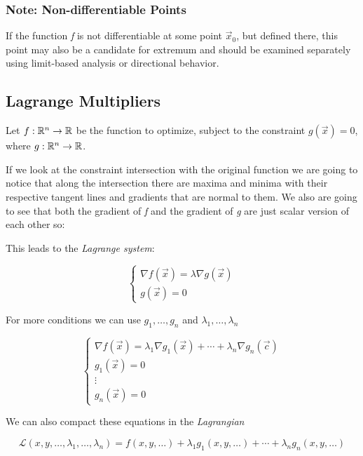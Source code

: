 \subsubsection{Note: Non-differentiable Points}

If the function \emph{f} is not differentiable at some point \( \vec{x}_0 \), but defined there, this 
point may also be a candidate for extremum and should be examined separately using limit-based analysis 
or directional behavior.

\subsection{Lagrange Multipliers}

Let \( f : \mathbb{R}^n \to \mathbb{R} \) be the function to optimize, subject to the constraint 
\( g(\vec{x}) = 0 \), where \( g : \mathbb{R}^n \to \mathbb{R} \).  
\vspace{\baselineskip}

If we look at the constraint intersection with the original function we are going to notice that along 
the intersection there are maxima and minima with their respective tangent lines and gradients that are 
normal to them. We also are going to see that both the gradient of \emph{f} and the gradient of \emph{g} are just scalar version of each other so: 
\vspace{\baselineskip}

This leads to the \emph{Lagrange system}:

\[
    \begin{cases}
        \nabla f(\vec{x}) = \lambda \nabla g(\vec{x}) \\
        g(\vec{x}) = 0
    \end{cases}
\]

For more conditions  we can use \(g_1, \dots, g_n\) and \(\lambda_1, \dots, \lambda_n\)

\[
    \begin{cases}
        \nabla f(\vec{x}) = \lambda_1 \nabla g_1(\vec{x}) + \cdots + \lambda_n \nabla g_n(\vec{c}) \\
        g_1(\vec{x}) = 0 \\
        \vdots \\
        g_n(\vec{x}) = 0
    \end{cases}
\]

We can also compact these equations in the \emph{Lagrangian}

\[
    \mathcal{L}(x,y, \dots, \lambda_1, \dots, \lambda_n) = f(x, y, \dots) + \lambda_1 g_1(x, y, \dots) + 
    \cdots + \lambda_n g_n(x, y, \dots)
\]

